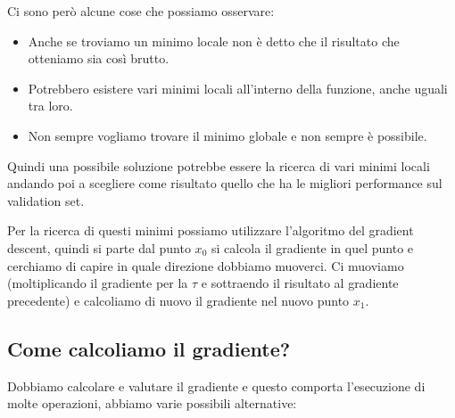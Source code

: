 \documentclass[14pt]{extreport}
\begin{document}
Ci sono però alcune cose che possiamo osservare:
\begin{itemize}
\item Anche se troviamo un minimo locale non è detto che il risultato che otteniamo sia così brutto.
\item Potrebbero esistere vari minimi locali all'interno della funzione, anche uguali tra loro.
\item Non sempre vogliamo trovare il minimo globale e non sempre è possibile.
\end{itemize}

Quindi una possibile soluzione potrebbe essere la ricerca di vari minimi locali andando poi a scegliere come risultato quello che ha le migliori
performance sul validation set.

Per la ricerca di questi minimi possiamo utilizzare l'algoritmo del gradient descent, quindi si parte dal punto $x_0$ si calcola il gradiente in quel
punto e cerchiamo di capire in quale direzione dobbiamo muoverci. Ci muoviamo (moltiplicando il gradiente per la $\tau$ e sottraendo il risultato al
gradiente precedente) e calcoliamo di nuovo il gradiente nel nuovo punto $x_1$.

\subsection{Come calcoliamo il gradiente?}

Dobbiamo calcolare e valutare il gradiente e questo comporta l'esecuzione di molte operazioni, abbiamo varie possibili alternative:
\end{document}
